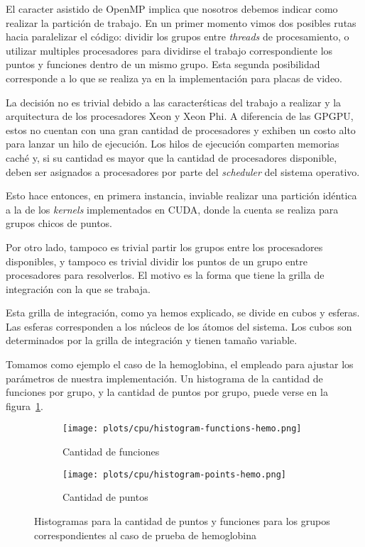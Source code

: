 El caracter asistido de OpenMP implica que nosotros debemos indicar como 
realizar la partici\'on de trabajo. En un primer momento vimos dos posibles rutas 
hacia paralelizar el c\'odigo: dividir los grupos entre \textit{threads} de 
procesamiento, o utilizar multiples procesadores para dividirse el trabajo 
correspondiente los puntos y funciones dentro de un mismo grupo. Esta segunda
posibilidad corresponde a lo que se realiza ya en la implementaci\'on para placas
de video.

La decisi\'on no es trivial debido a las caracter\'sticas del trabajo a realizar
y la arquitectura de los procesadores Xeon y Xeon Phi. A diferencia de las GPGPU,
estos no cuentan con una gran cantidad de procesadores y exhiben un costo alto
para lanzar un hilo de ejecuci\'on. Los hilos de ejecuci\'on comparten memorias
cach\'e y, si su cantidad es mayor que la cantidad de procesadores disponible,
deben ser asignados a procesadores por parte del \textit{scheduler} del sistema
operativo.

Esto hace entonces, en primera instancia, inviable realizar una partici\'on id\'entica a 
la de los \textit{kernels} implementados en CUDA, donde la cuenta se realiza para 
grupos chicos de puntos.

Por otro lado, tampoco es trivial partir los grupos entre los procesadores disponibles,
y tampoco es trivial dividir los puntos de un grupo entre procesadores para resolverlos.
El motivo es la forma que tiene la grilla de integraci\'on con la que se trabaja.

Esta grilla de integraci\'on, como ya hemos explicado, se divide en cubos y 
esferas. Las esferas corresponden a los n\'ucleos de los \'atomos del sistema.
Los cubos son determinados por la grilla de integraci\'on y tienen tama\~no
variable. 

Tomamos como ejemplo el caso de la hemoglobina, el empleado para ajustar los
par\'ametros de nuestra implementaci\'on. Un histograma de la cantidad de 
funciones por grupo, y la cantidad de puntos por grupo, puede verse en la 
figura~\ref{fig:lio-histo-groups}.

\begin{figure}[htbp]
   \centering
   \begin{subfigure}[b]{\plotwidthtres}
     \texttt{[image: plots/cpu/histogram-functions-hemo.png]}
     \caption{Cantidad de funciones}
   \end{subfigure}
   \begin{subfigure}[b]{\plotwidthtres}
     \texttt{[image: plots/cpu/histogram-points-hemo.png]}
     \caption{Cantidad de puntos}
   \end{subfigure}
   \caption{Histogramas para la cantidad de puntos y funciones para los grupos correspondientes al caso de prueba
   de hemoglobina}
   \label{fig:lio-histo-groups}
\end{figure}

